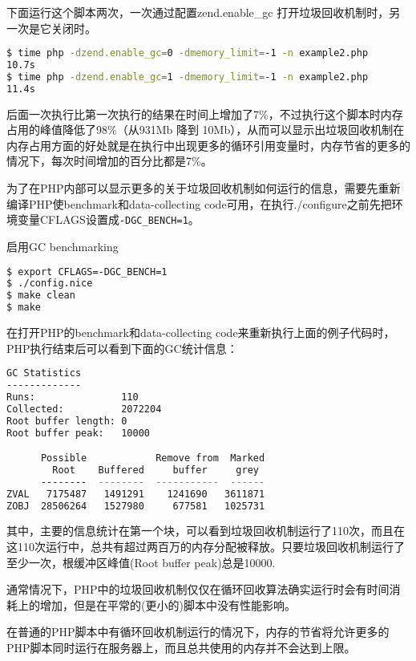 下面运行这个脚本两次，一次通过配置zend.enable\_gc 打开垃圾回收机制时，另一次是它关闭时。


\begin{lstlisting}[language=bash]
$ time php -dzend.enable_gc=0 -dmemory_limit=-1 -n example2.php
10.7s
$ time php -dzend.enable_gc=1 -dmemory_limit=-1 -n example2.php
11.4s
\end{lstlisting}

后面一次执行比第一次执行的结果在时间上增加了7\%，不过执行这个脚本时内存占用的峰值降低了98\%（从931Mb 降到 10Mb），从而可以显示出垃圾回收机制在内存占用方面的好处就是在执行中出现更多的循环引用变量时，内存节省的更多的情况下，每次时间增加的百分比都是7\%。

为了在PHP内部可以显示更多的关于垃圾回收机制如何运行的信息，需要先重新编译PHP使benchmark和data-collecting code可用，在执行./configure之前先把环境变量CFLAGS设置成\texttt{-DGC\_BENCH=1}。

\begin{example}
启用GC benchmarking
\begin{lstlisting}[language=bash]
$ export CFLAGS=-DGC_BENCH=1
$ ./config.nice
$ make clean
$ make
\end{lstlisting}
\end{example}

在打开PHP的benchmark和data-collecting code来重新执行上面的例子代码时，PHP执行结束后可以看到下面的GC统计信息：

\begin{lstlisting}[language=bash]
GC Statistics
-------------
Runs:               110
Collected:          2072204
Root buffer length: 0
Root buffer peak:   10000

      Possible            Remove from  Marked
        Root    Buffered     buffer     grey
      --------  --------  -----------  ------
ZVAL   7175487   1491291    1241690   3611871
ZOBJ  28506264   1527980     677581   1025731
\end{lstlisting}

其中，主要的信息统计在第一个块，可以看到垃圾回收机制运行了110次，而且在这110次运行中，总共有超过两百万的内存分配被释放。只要垃圾回收机制运行了至少一次，根缓冲区峰值(Root buffer peak)总是10000.

通常情况下，PHP中的垃圾回收机制仅仅在循环回收算法确实运行时会有时间消耗上的增加，但是在平常的(更小的)脚本中没有性能影响。



在普通的PHP脚本中有循环回收机制运行的情况下，内存的节省将允许更多的PHP脚本同时运行在服务器上，而且总共使用的内存并不会达到上限。

